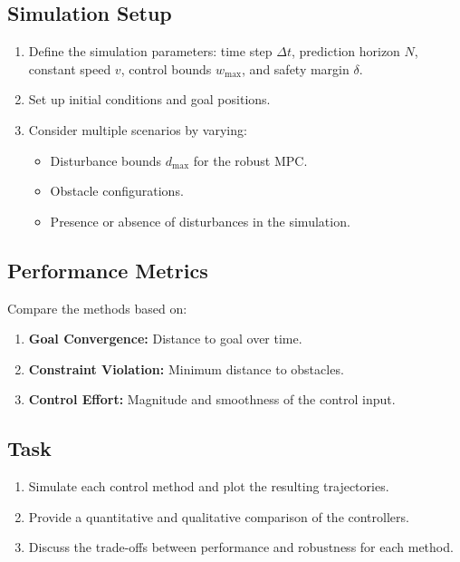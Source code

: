 \documentclass[11pt]{article}
\begin{document}
\subsection{Simulation Setup}
\begin{enumerate}[label=\arabic*.]
    \item Define the simulation parameters: time step $\Delta t$, prediction horizon $N$, constant speed $v$, control bounds $w_{\max}$, and safety margin $\delta$.
    \item Set up initial conditions and goal positions.
    \item Consider multiple scenarios by varying:
    \begin{itemize}
        \item Disturbance bounds $d_{\max}$ for the robust MPC.
        \item Obstacle configurations.
        \item Presence or absence of disturbances in the simulation.
    \end{itemize}
\end{enumerate}

\subsection{Performance Metrics}
Compare the methods based on:
\begin{enumerate}[label=\arabic*.]
    \item \textbf{Goal Convergence:} Distance to goal over time.
    \item \textbf{Constraint Violation:} Minimum distance to obstacles.
    \item \textbf{Control Effort:} Magnitude and smoothness of the control input.
\end{enumerate}

\subsection{Task}
\begin{enumerate}[label=\arabic*.]
    \item Simulate each control method and plot the resulting trajectories.
    \item Provide a quantitative and qualitative comparison of the controllers.
    \item Discuss the trade-offs between performance and robustness for each method.
\end{enumerate}
\end{document}
